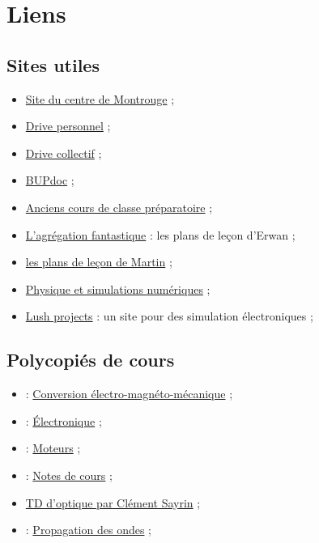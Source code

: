 \chapter*{Liens}

\section*{Sites utiles}

\begin{itemize}
\item \href{http://ressources.agreg.phys.ens.fr/index}{Site du centre de Montrouge} ;
\item \href{https://drive.google.com/drive/folders/1k25PmoJLoWdJqkvU63OvsjhtP5SWEFPo?usp=sharing}{Drive personnel} ;
\item \href{https://drive.google.com/drive/folders/1Xz8t7SrdGd-0hLLhcAqeeyTuv98uMSQ1?usp=sharing}{Drive collectif} ;
\item \href{http://bupdoc.udppc.asso.fr/consultation/selections.php}{BUPdoc} ;
\item \href{http://www.joelsornette.fr/}{Anciens cours de classe préparatoire} ;
\item \href {https://studylibfr.com/doc/2383850/l-agr\%C3\%A9gation-fantastique}{L'agrégation fantastique} : les plans de leçon d'Erwan ;
\item \href{https://drive.google.com/drive/folders/1wgFxMkxD-4UWiHGE1ZdUXB98ikuZ6FL-}{les plans de leçon de Martin} ;
\item \href{http://ressources.univ-lemans.fr/AccesLibre/UM/Pedago/physique/02/}{Physique et simulations numériques} ;
\item \href{https://lushprojects.com/circuitjs/}{Lush projects} : un site pour des simulation électroniques ;
\end{itemize}

\section*{Polycopiés de cours}

\begin{itemize}
\item \cite{Naval} : \href{https://lnspe2.fr/Cours_Phys/CP02.pdf}{Conversion électro-magnéto-mécanique} ;
\item \cite{Neveu2019a} : \href{https://gitlab.in2p3.fr/Jeremy/Electronique}{Électronique} ;
\item \cite{Neveu2019} : \href{https://gitlab.in2p3.fr/Jeremy/Moteurs}{Moteurs} ;
\item \cite{Rabaud2019} : \href{http://www.fast.u-psud.fr/~rabaud/}{Notes de cours} ;
\item \href{http://www.lkb.upmc.fr/cqed/teaching/teachingsayrin/}{TD d'optique par Clément Sayrin} ;
\item \cite{Thibierge2014} : \href{https://www.etienne-thibierge.fr/agreg/ondes_poly_2015.pdf}{Propagation des ondes} ;
\end{itemize}


